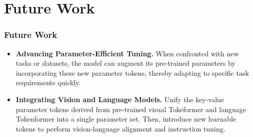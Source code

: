 \section{Future Work}
\begin{frame}
\frametitle{Future Work}
\begin{itemize}
    \item \textbf{Advancing Parameter-Efficient Tuning.}
    When confronted with new tasks or datasets, the model can augment its pre-trained parameters
    by incorporating these new parameter tokens, thereby adapting to specific task requirements quickly.

    \item \textbf{Integrating Vision and Language Models.}
    Unify the key-value parameter tokens derived from pre-trained
    visual Tokeformer and language Tokenformer into a single parameter set.
    Then, introduce new learnable tokens to perform vision-language alignment
    and instruction tuning.
    
\end{itemize}
\end{frame}